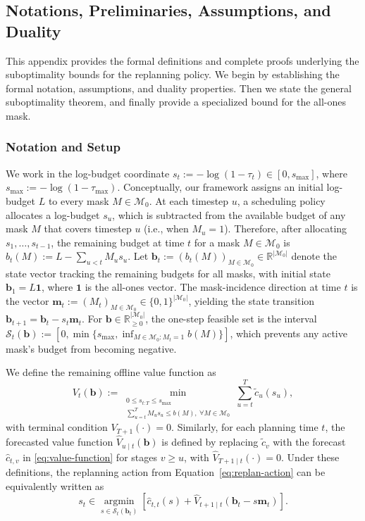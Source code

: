 \documentclass{uai2026} %
\newcommand{\R}{\mathbb{R}}
\newcommand{\1}{\mathbf{1}}
\newcommand{\scalt}{\mathcal{S}_{t}}
\newcommand{\mcal}{\mathcal{M}}
\newcommand{\argmin}{\operatorname*{argmin}}
\begin{document}
\subsection{Notations, Preliminaries, Assumptions, and Duality}
\label{app:replanning}

This appendix provides the formal definitions and complete proofs underlying the suboptimality bounds for the replanning policy.
We begin by establishing the formal notation, assumptions, and duality properties.
Then we state the general suboptimality theorem, and finally provide a specialized bound for the all-ones mask.

\subsubsection{Notation and Setup}
\label{app:replanning-prelim}

We work in the log-budget coordinate $s_t := -\log(1-\tau_t) \in [0, s_{\max}]$, where $s_{\max} := -\log(1-\tau_{\max})$.
Conceptually, our framework assigns an initial log-budget $L$ to every mask $M \in \mcal_0$. At each timestep $u$, a scheduling policy allocates a log-budget $s_u$, which is subtracted from the available budget of any mask $M$ that covers timestep $u$ (i.e., when $M_u = 1$).
Therefore, after allocating $s_1, \dots, s_{t-1}$, the remaining budget at time $t$ for a mask $M \in \mcal_{0}$ is $b_t(M) := L - \sum_{u < t} M_u s_u$.
Let $\mathbf{b}_t := (b_t(M))_{M \in \mcal_{0}} \in \R^{|\mcal_{0}|}$ denote the state vector tracking the remaining budgets for all masks, with initial state $\mathbf{b}_1 = L\1$, where $\1$ is the all-ones vector.
The mask-incidence direction at time $t$ is the vector $\mathbf{m}_t := (M_t)_{M \in \mcal_{0}} \in \{0,1\}^{|\mcal_{0}|}$, yielding the state transition $\mathbf{b}_{t+1} = \mathbf{b}_t - s_t \mathbf{m}_t$.
For $\mathbf{b} \in \R_{\ge 0}^{|\mcal_{0}|}$, the one-step feasible set is the interval $\scalt(\mathbf{b}) := [0, \min\{s_{\max}, \inf_{M\in\mcal_{0}: M_t = 1} b(M)\}]$, which prevents any active mask's budget from becoming negative.

We define the remaining offline value function as
\begin{equation}
  \label{eq:value-function}
  V_t(\mathbf{b})
  := \min_{\substack{0 \le s_{t:T} \le s_{\max} \\
  \sum_{u=t}^{T} M_u s_u \le b(M),\ \forall M \in \mcal_{0}}}
  \sum_{u=t}^{T} \tilde{c}_u(s_u),
\end{equation}
with terminal condition $V_{T+1}(\cdot) = 0$.
Similarly, for each planning time $t$, the forecasted value function $\hat{V}_{u \mid t}(\mathbf{b})$ is defined by replacing $\tilde{c}_v$ with the forecast $\hat{c}_{t,v}$ in \eqref{eq:value-function} for stages $v \ge u$, with $\hat{V}_{T+1 \mid t}(\cdot)=0$.
Under these definitions, the replanning action from Equation~\eqref{eq:replan-action} can be equivalently written as
\begin{equation}
  \label{eq:replan-action-value}
  s_t \in \argmin_{s \in \scalt(\mathbf{b}_t)} \left[ \hat{c}_{t,t}(s) + \hat{V}_{t+1 \mid t}(\mathbf{b}_t - s\mathbf{m}_t) \right].
\end{equation}
\end{document}
